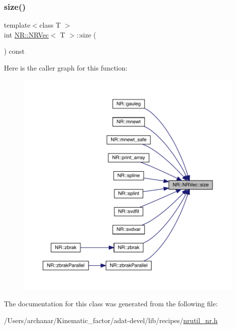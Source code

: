 \mbox{\label{classNR_1_1NRVec_ab0dfb2d7ce74022fa0ce42138f4a224b}} 
\subsubsection{\texorpdfstring{size()}{size()}\hspace{0.1cm}{\footnotesize\ttfamily [3/3]}}
{\footnotesize\ttfamily template$<$class T $>$ \\
int \mbox{\hyperlink{classNR_1_1NRVec}{N\+R\+::\+N\+R\+Vec}}$<$ T $>$\+::size (\begin{DoxyParamCaption}{ }\end{DoxyParamCaption}) const\hspace{0.3cm}{\ttfamily [inline]}}

Here is the caller graph for this function\+:
\nopagebreak
\begin{figure}[H]
\begin{center}
\leavevmode
\includegraphics[width=350pt]{d6/d38/classNR_1_1NRVec_ab0dfb2d7ce74022fa0ce42138f4a224b_icgraph}
\end{center}
\end{figure}


The documentation for this class was generated from the following file\+:\begin{DoxyCompactItemize}
\item 
/\+Users/archanar/\+Kinematic\+\_\+factor/adat-\/devel/lib/recipes/\mbox{\hyperlink{adat-devel_2lib_2recipes_2nrutil__nr_8h}{nrutil\+\_\+nr.\+h}}\end{DoxyCompactItemize}
